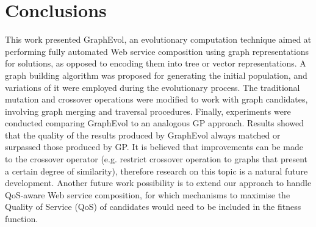 \documentclass{article}
\begin{document}
\section{Conclusions}\label{conclusions}
This work presented GraphEvol, an evolutionary computation technique aimed at performing fully automated Web service composition using graph representations for solutions, as opposed to encoding them into tree or vector representations. A graph building algorithm was proposed for generating the initial population, and variations of it were employed during the evolutionary process. The traditional mutation and crossover operations were modified to work with graph candidates, involving graph merging and traversal procedures. Finally, experiments were conducted comparing GraphEvol to an analogous GP approach. Results showed that the quality of the results produced by GraphEvol always matched or surpassed those produced by GP. It is believed that improvements can be made to the crossover operator (e.g. restrict crossover operation to graphs that present a certain degree of similarity), therefore research on this topic is a natural future development. Another future work possibility is to extend our approach to handle QoS-aware Web service composition, for which mechanisms to maximise the Quality of Service (QoS) of candidates \cite{jaeger2007qos} would need to be included in the fitness function.

\clearpage


\end{document}
